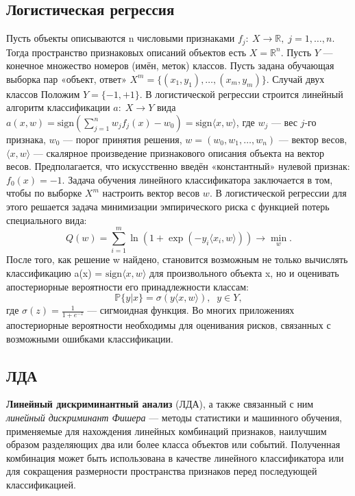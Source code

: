 \subsection{Логистическая регрессия}
Пусть объекты описываются n числовыми признаками  $f_j:\: X\to\mathbb{R},\; j=1,\ldots,n$. Тогда пространство признаковых описаний объектов есть $X=\mathbb{R}^n$. Пусть $Y$ — конечное множество номеров (имён, меток) классов.
Пусть задана обучающая выборка пар «объект, ответ»  $X^m = \{(x_1,y_1),\dots,(x_m,y_m)\}$.
Случай двух классов
Положим $Y=\{-1,+1\}$. В логистической регрессии строится линейный алгоритм классификации $a:\; X\to Y$ вида
$a(x,w) = \mathrm{sign}\left( \sum_{j=1}^n w_j f_j(x) - w_0 \right) = \mathrm{sign}\langle x,w \rangle$,
где  $w_j$ — вес $j$-го признака,  $w_0$ — порог принятия решения, $w=(w_0,w_1,\ldots,w_n)$ — вектор весов, $\langle x,w \rangle$ — скалярное произведение признакового описания объекта на вектор весов. Предполагается, что искусственно введён «константный» нулевой признак: $f_{0}(x)=-1.$
Задача обучения линейного классификатора заключается в том, чтобы по выборке  $X^m$ настроить вектор весов $w$. В логистической регрессии для этого решается задача минимизации эмпирического риска с функцией потерь специального вида:
\begin{equation}
Q(w) = \sum_{i=1}^m \ln\left( 1 + \exp( -y_i \langle x_i,w \rangle ) \right) \to \min_{w}.
\end{equation}
После того, как решение w найдено, становится возможным не только вычислять классификацию a(x) = $\mathrm{sign}\langle x,w \rangle$ для произвольного объекта x, но и оценивать апостериорные вероятности его принадлежности классам:
\begin{equation}
\mathbb{P}\{y|x\} = \sigma\left( y \langle x,w \rangle\right),\;\; y\in Y,
\end{equation}
где $\sigma(z) = \frac1{1+e^{-z}}$ — сигмоидная функция. Во многих приложениях апостериорные вероятности необходимы для оценивания рисков, связанных с возможными ошибками классификации.

\subsection{ЛДА}
\textbf{Линейный дискриминантный анализ} (ЛДА), а также связанный с ним \textit{линейный дискриминант Фишера} — методы статистики и машинного обучения, применяемые для нахождения линейных комбинаций признаков, наилучшим образом разделяющих два или более класса объектов или событий. Полученная комбинация может быть использована в качестве линейного классификатора или для сокращения размерности пространства признаков перед последующей классификацией.


